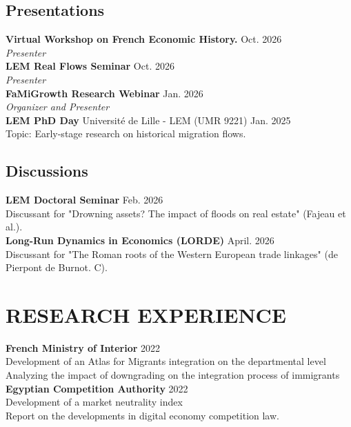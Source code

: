 \documentclass[a4paper,9pt]{extarticle}
\begin{document}
    \subsection*{Presentations}
     

    \noindent
    \textbf{Virtual Workshop on French Economic History.} \hfill Oct. 2026 \\
    \textit{Presenter} \\


    \noindent
    \textbf{LEM Real Flows Seminar} \hfill Oct. 2026 \\
    \textit{Presenter} \\
    
    \noindent
    \textbf{FaMiGrowth Research Webinar} \hfill Jan. 2026 \\
    \textit{Organizer and Presenter} \\

    \noindent
    \textbf{LEM PhD Day}  Université de Lille - LEM (UMR 9221) \hfill Jan. 2025 \\
    Topic: Early-stage research on historical migration flows.

    \subsection*{Discussions}
    \noindent
    \textbf{LEM Doctoral Seminar} \hfill Feb. 2026 \\
    Discussant for "Drowning assets? The impact of floods on real estate" (Fajeau et al.).\\
        
    \noindent
    \textbf{Long-Run Dynamics in Economics (LORDE)} \hfill April. 2026 \\
    Discussant for "The Roman roots of the Western European trade linkages" (de Pierpont de Burnot. C).


\section*{RESEARCH EXPERIENCE}

    \noindent
    \textbf{French Ministry of Interior} \hfill 2022 \\ 
    Development of an Atlas for Migrants integration on the departmental level\\ 
    Analyzing the impact of downgrading on the integration process of immigrants\\
        
    \noindent
    \textbf{Egyptian Competition Authority} \hfill 2022 \\ 
    Development of a market neutrality index\\ 
    Report on the developments in digital economy competition law.\\
\end{document}
